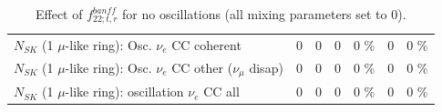 \begin{table}
\begin{tabular}{| l | r | r | r  r | r  r |}
                          $N_{SK}$ (1 $\mu$-like ring): Osc. $\nu_e$ CC coherent &               0 &               0 &               0 &        0 \%  &               0 &        0 \%  \\ 
           $N_{SK}$ (1 $\mu$-like ring): Osc. $\nu_e$ CC other ($\nu_\mu$ disap) &               0 &               0 &               0 &        0 \%  &               0 &        0 \%  \\ 
                        $N_{SK}$ (1 $\mu$-like ring): oscillation $\nu_e$ CC all &               0 &               0 &               0 &        0 \%  &               0 &        0 \%  \\ 
\hline
\hline
\end{tabular}
\caption{ Effect of $f_{22; t, r}^{banff}$ for no oscillations (all mixing parameters set to 0). }
\label{tab:num_banff_cc1piE1_1RmuT_3f_osc_t13:0}
\end{table}
\clearpage
